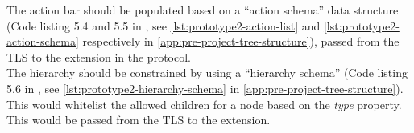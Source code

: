 The action bar should be populated based on a ``action schema'' data structure (Code listing 5.4 and 5.5 in \cite[p.~45]{rekstadModelingEnvironmentCloud2020}, see \cref{lst:prototype2-action-list} and \cref{lst:prototype2-action-schema} respectively in \cref{app:pre-project-tree-structure}), passed from the TLS to the extension in the protocol.\\

The hierarchy should be constrained by using a ``hierarchy schema'' (Code listing 5.6 in \cite[p.~45]{rekstadModelingEnvironmentCloud2020}, see \cref{lst:prototype2-hierarchy-schema} in \cref{app:pre-project-tree-structure}).
This would whitelist the allowed children for a node based on the \textit{type} property.
This would be passed from the TLS to the extension.
